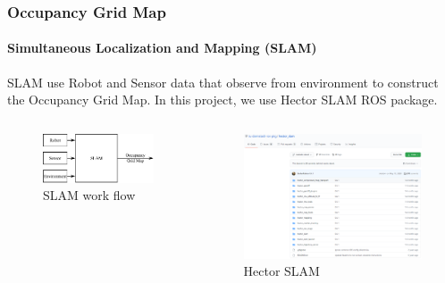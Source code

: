 \begin{frame}
	\frametitle{Occupancy Grid Map}
	\framesubtitle{Simultaneous Localization and Mapping (SLAM)}
	SLAM use Robot and Sensor data that observe from environment to construct the Occupancy Grid Map. In this project, we use Hector SLAM ROS package.
	\begin{columns}
		\begin{figure}[h]
			\caption{SLAM work flow}
			\includegraphics[scale=0.7]{image/slaming.pdf}
		\end{figure}
	
		\begin{figure}[h]
			\caption{Hector SLAM\footnotemark}
			\includegraphics[scale=0.15]{image/hector.png}
		\end{figure}
	\end{columns}
\end{frame}



